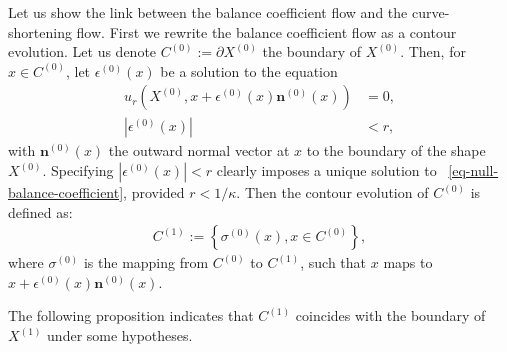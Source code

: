 \documentclass[review]{siamart220329}
\begin{document}
Let us show the link between the balance coefficient flow and the
curve-shortening flow. First we rewrite the balance coefficient flow
as a contour evolution. Let us denote $C^{(0)} := \partial
X^{(0)}$ the boundary of $X^{(0)}$. Then, for $x \in C^{(0)}$,
let $\epsilon^{(0)}(x)$ be a solution to the equation
\begin{align} \label{eq-null-balance-coefficient}
  u_r(X^{(0)}, x +\epsilon^{(0)}(x)
  \mathbf{n}^{(0)}(x)) & = 0, \\
  |\epsilon^{(0)}(x)| & < r, \nonumber
\end{align}
with $\mathbf{n}^{(0)}(x)$ the outward normal vector at $x$ to
the boundary of the shape $X^{(0)}$. Specifying
$|\epsilon^{(0)}(x)| < r$ clearly imposes a unique solution to
~\cref{eq-null-balance-coefficient}, provided $r < 1/\kappa$. Then the
contour evolution of $C^{(0)}$ is defined as:
\begin{align} \label{eq-balance-coefficient-contour-flow}
  C^{(1)} := \left\{ \sigma^{(0)}(x), x \in C^{(0)} \right\},
\end{align}
where $\sigma^{(0)}$ is the mapping from $C^{(0)}$ to $C^{(1)}$, such that $x$ maps to $x+\epsilon^{(0)}(x) \mathbf{n}^{(0)}(x)$.

The following proposition indicates that $C^{(1)}$ coincides with
the boundary of $X^{(1)}$ under some hypotheses.
\end{document}
